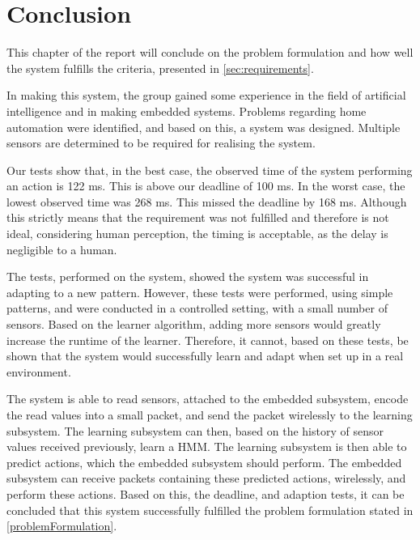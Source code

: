 \chapter{Conclusion}

This chapter of the report will conclude on the problem formulation and how well the system fulfills the criteria, presented in \cref{sec:requirements}.

In making this system, the group gained some experience in the field of artificial intelligence and in making embedded systems. Problems regarding home automation were identified, and based on this, a system was designed. Multiple sensors are determined to be required for realising the system. 

Our tests show that, in the best case, the observed time of the system performing an action is 122 ms. This is above our deadline of 100 ms. In the worst case,  the lowest observed time was 268 ms. This missed the deadline by 168 ms. Although this strictly means that the requirement was not fulfilled and therefore is not ideal, considering human perception, the timing is acceptable, as the delay is negligible to a human.

The tests, performed on the system, showed the system was successful in adapting to a new pattern. However, these tests were performed, using simple patterns, and were conducted in a controlled setting, with a small number of sensors. Based on the learner algorithm, adding more sensors would greatly increase the runtime of the learner. Therefore, it cannot, based on these tests, be shown that the system would successfully learn and adapt when set up in a real environment.

The system is able to read sensors, attached to the embedded subsystem, encode the read values into a small packet, and send the packet wirelessly to the learning subsystem. The learning subsystem can then, based on the history of sensor values received previously, learn a HMM. The learning subsystem is then able to predict actions, which the embedded subsystem should perform. The embedded subsystem can receive packets containing these predicted actions, wirelessly, and perform these actions. Based on this, the deadline, and adaption tests, it can be concluded that this system successfully fulfilled the problem formulation stated in \cref{problemFormulation}.  
